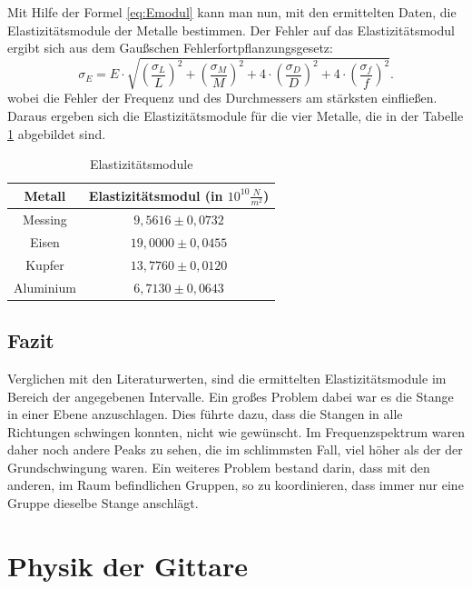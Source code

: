 \documentclass[a4paper, 11pt]{article}
\begin{document}
\noindent Mit Hilfe der Formel \ref{eq:Emodul} kann man nun, mit den ermittelten Daten, die Elastizitätsmodule der Metalle bestimmen. Der Fehler auf das Elastizitätsmodul ergibt sich aus dem Gaußschen Fehlerfortpflanzungsgesetz:
\begin{equation}
\sigma_E = E \cdot \sqrt{\left(\frac{\sigma_L}{L}\right)^2 + \left(\frac{\sigma_M}{M}\right)^2 + 4 \cdot \left(\frac{\sigma_D}{D}\right)^2 + 4 \cdot \left(\frac{\sigma_f}{f}\right)^2}.
\end{equation} 
wobei die Fehler der Frequenz und des Durchmessers am stärksten einfließen.
Daraus ergeben sich die Elastizitätsmodule für die vier Metalle, die in der Tabelle \ref{Tabelle 3} abgebildet sind.  

\begin{table}[H]
\centering
\large
\renewcommand{\arraystretch}{1.2}
\begin{tabular}{|c|c|}
\hline Metall & Elastizitätsmodul (in $10^{10} \frac{N}{m^2}$) \\
\hline Messing & $9,5616 \pm 0,0732$ \\
Eisen & $19,0000 \pm 0,0455$ \\
Kupfer & $13,7760 \pm 0,0120$ \\
Aluminium & $6,7130 \pm 0,0643$ \\
\hline
\end{tabular}
\caption{Elastizitätsmodule}
\label{Tabelle 3}
\end{table}

\subsection{Fazit}
Verglichen mit den Literaturwerten, sind die ermittelten Elastizitätsmodule im Bereich der angegebenen Intervalle. Ein großes Problem dabei war es die Stange in einer Ebene anzuschlagen. Dies führte dazu, dass die Stangen in alle Richtungen schwingen konnten, nicht wie gewünscht. Im Frequenzspektrum waren daher noch andere Peaks zu sehen, die im schlimmsten Fall, viel höher als der der Grundschwingung waren. 
Ein weiteres Problem bestand darin, dass mit den anderen, im Raum befindlichen Gruppen, so zu koordinieren, dass immer nur eine Gruppe dieselbe Stange anschlägt. 

\newpage
\section{Physik der Gittare}
\end{document}

